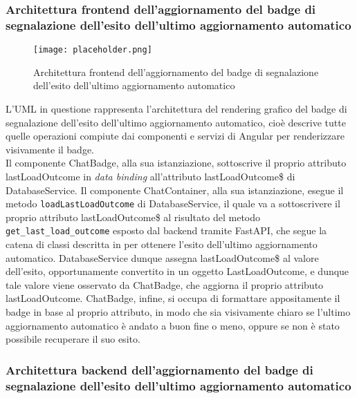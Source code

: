 \newpage


\subsubsection{Architettura frontend dell’aggiornamento del badge di segnalazione dell’esito dell’ultimo aggiornamento automatico}
\label{sec:architettura_frontend_badge_aggiornamento}

\begin{figure}[h]
    \centering
    \texttt{[image: placeholder.png]}
    \caption{Architettura frontend dell’aggiornamento del badge di segnalazione dell’esito dell’ultimo aggiornamento automatico}
\end{figure}

L'UML in questione rappresenta l'architettura del rendering grafico del badge di segnalazione dell'esito dell'ultimo aggiornamento automatico, cioè descrive tutte quelle operazioni compiute dai componenti e servizi di Angular per renderizzare visivamente il badge.\\
Il componente ChatBadge, alla sua istanziazione, sottoscrive il proprio attributo lastLoadOutcome in \emph{data binding} all'attributo lastLoadOutcome\$ di DatabaseService. Il componente ChatContainer, alla sua istanziazione, esegue il metodo \texttt{loadLastLoadOutcome} di DatabaseService, il quale va a sottoscrivere il proprio attributo lastLoadOutcome\$ al risultato del metodo \texttt{get\_last\_load\_outcome} esposto dal backend tramite FastAPI, che segue la catena di classi descritta in  per ottenere l'esito dell'ultimo aggiornamento automatico. DatabaseService dunque assegna lastLoadOutcome\$ al valore dell'esito, opportunamente convertito in un oggetto LastLoadOutcome, e dunque tale valore viene osservato da ChatBadge, che aggiorna il proprio attributo lastLoadOutcome. ChatBadge, infine, si occupa di formattare appositamente il badge in base al proprio attributo, in modo che sia visivamente chiaro se l'ultimo aggiornamento automatico è andato a buon fine o meno, oppure se non è stato possibile recuperare il suo esito.

\newpage


\subsubsection{Architettura backend dell’aggiornamento del badge di segnalazione dell’esito dell’ultimo aggiornamento automatico}
\label{sec:architettura_backend_badge_aggiornamento}


